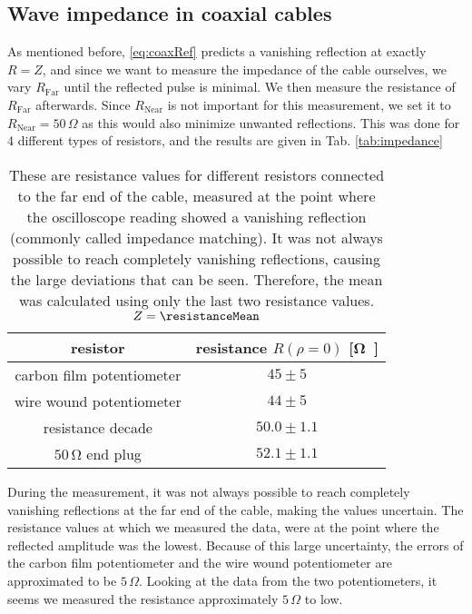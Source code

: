 \documentclass[a4paper,10pt,twocolumn]{article}
\begin{document}
    \subsection{Wave impedance in coaxial cables}
    As mentioned before, \autoref{eq:coaxRef} predicts a vanishing reflection at exactly $R=Z$, and since we want to measure the impedance of the cable ourselves, we vary $R_{\text{Far}}$ until the reflected pulse is minimal.
    We then measure the resistance of $R_{\text{Far}}$ afterwards.
    Since $R_{\text{Near}}$ is not important for this measurement, we set it to $R_{\text{Near}}=50\,\Omega$ as this would also minimize unwanted reflections.
    This was done for 4 different types of resistors, and the results are given in Tab. \autoref{tab:impedance}
    \begin{table}[htbp]          %
        \centering
        \begin{tabular*}{\linewidth}{@{\extracolsep{\fill}}cc}
            \hline
            \hline
            \rule[-7pt]{0pt}{23pt}  resistor  &  resistance $R(\rho=0)$ [\si\ohm]  	 \\
            \hline
            \rule[-5pt]{0pt}{23pt}   carbon film potentiometer   &   $45 \pm 5$  	 \\
            \rule[-5pt]{0pt}{23pt}   wire wound potentiometer   &   $44 \pm 5$  	 \\
            \rule[-5pt]{0pt}{23pt}   resistance decade   &   $50.0 \pm 1.1$  	 \\
            \rule[-5pt]{0pt}{23pt}   $50\,\si\ohm$ end plug   &   $52.1 \pm 1.1$  	 \\
            \hline
            \hline
        \end{tabular*}
        \normalsize
        \caption[]{These are resistance values for different resistors connected to the far end of the cable, measured at the point where the oscilloscope reading showed a vanishing reflection (commonly called impedance matching).
        It was not always possible to reach completely vanishing reflections, causing the large deviations that can be seen.
        Therefore, the mean was calculated using only the last two resistance values.
        $Z=\resistanceMean $}  %
        \label{tab:impedance}                             %
    \end{table}
    
    During the measurement, it was not always possible to reach completely vanishing reflections at the far end of the cable, making the values uncertain.
    The resistance values at which we measured the data, were at the point where the reflected amplitude was the lowest.
    Because of this large uncertainty, the errors of the carbon film potentiometer and the wire wound potentiometer are approximated to be $5\,\Omega$.
    Looking at the data from the two potentiometers, it seems we measured the resistance approximately $5\,\Omega$ to low.
    
\end{document}
